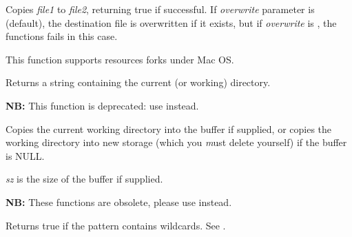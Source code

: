 Copies {\it file1} to {\it file2}, returning true if successful. If
{\it overwrite} parameter is \true (default), the destination file is overwritten
if it exists, but if {\it overwrite} is \false, the functions fails in this
case.

This function supports resources forks under Mac OS.


\label{wxgetcwd}


Returns a string containing the current (or working) directory.


\label{wxgetworkingdirectory}


{\bf NB:} This function is deprecated: use  instead.

Copies the current working directory into the buffer if supplied, or
copies the working directory into new storage (which you {\emph must} delete
yourself) if the buffer is NULL.

{\it sz} is the size of the buffer if supplied.


\label{wxgettempfilename}




{\bf NB:} These functions are obsolete, please use\rtfsp
{}\rtfsp
instead.


\label{wxiswild}


Returns true if the pattern contains wildcards. See .


